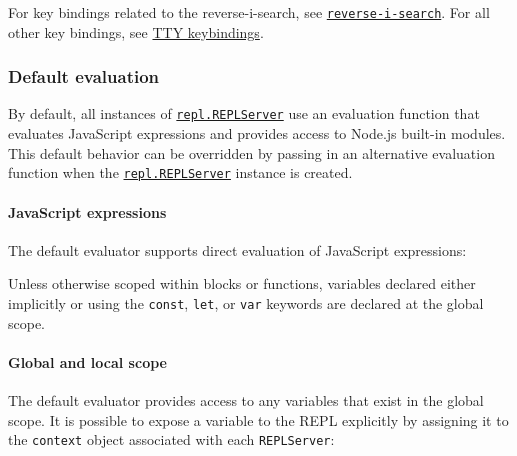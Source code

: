 For key bindings related to the reverse-i-search, see
\hyperref[reverse-i-search]{\texttt{reverse-i-search}}. For all other
key bindings, see \href{readline.md\#tty-keybindings}{TTY keybindings}.

\subsubsection{Default evaluation}\label{default-evaluation}

By default, all instances of
\hyperref[class-replserver]{\texttt{repl.REPLServer}} use an evaluation
function that evaluates JavaScript expressions and provides access to
Node.js built-in modules. This default behavior can be overridden by
passing in an alternative evaluation function when the
\hyperref[class-replserver]{\texttt{repl.REPLServer}} instance is
created.

\paragraph{JavaScript expressions}\label{javascript-expressions}

The default evaluator supports direct evaluation of JavaScript
expressions:

\begin{Shaded}
\begin{Highlighting}[]
\end{Highlighting}
\end{Shaded}

Unless otherwise scoped within blocks or functions, variables declared
either implicitly or using the \texttt{const}, \texttt{let}, or
\texttt{var} keywords are declared at the global scope.

\paragraph{Global and local scope}\label{global-and-local-scope}

The default evaluator provides access to any variables that exist in the
global scope. It is possible to expose a variable to the REPL explicitly
by assigning it to the \texttt{context} object associated with each
\texttt{REPLServer}:

\begin{Shaded}
\begin{Highlighting}[]
\OperatorTok{=} \NormalTok{(}\NormalTok{)}\OperatorTok{;}
\OperatorTok{=} \OperatorTok{;}

\NormalTok{(}\StringTok{\textquotesingle{}\textgreater{} \textquotesingle{}}\NormalTok{)} \OperatorTok{=}\OperatorTok{;}
\end{Highlighting}
\end{Shaded}

